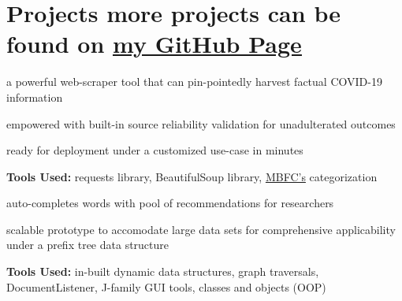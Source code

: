 \section{Projects \small{more projects can be found on \href{https://www.github.com/isobarbaric}{\underline{my GitHub Page}}}}

\begin{tightemize}
\item a powerful web-scraper tool that can pin-pointedly harvest factual COVID-19 information
\item empowered with built-in source reliability validation for unadulterated outcomes   
\item ready for deployment under a customized use-case in minutes 
\item \textbf{Tools Used:} requests library, BeautifulSoup library, \href{https://mediabiasfactcheck.com/pro-science/}{MBFC's} categorization 
\end{tightemize}
\sectionsep


\begin{tightemize}
\item auto-completes words with pool of recommendations for researchers \item scalable prototype to accomodate large data sets for comprehensive applicability under a prefix tree data structure 
\item \textbf{Tools Used:} in-built dynamic data structures, graph traversals, DocumentListener, J-family GUI tools, classes and objects (OOP)
\end{tightemize}
\sectionsep


